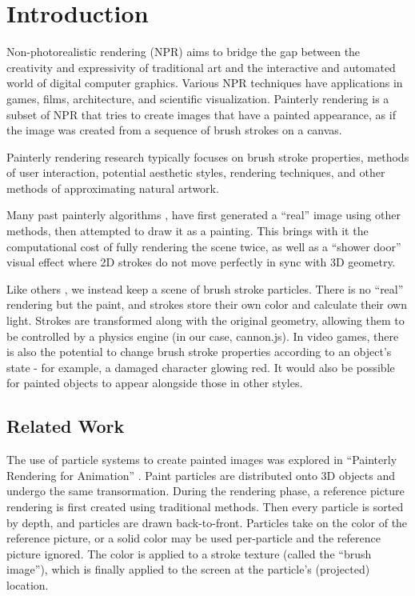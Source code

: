 \documentclass[conference]{acmsiggraph}
\begin{document}
\section{Introduction}

Non-photorealistic rendering (NPR) aims to bridge the gap between the
creativity and expressivity of traditional art and the interactive and
automated world of digital computer graphics. Various NPR techniques have
applications in games, films, architecture, and scientific visualization.
Painterly rendering is a subset of NPR that tries to create images that have a
painted appearance, as if the image was created from a sequence of brush
strokes on a canvas.

Painterly rendering research typically focuses on brush stroke properties,
methods of user interaction, potential aesthetic styles, rendering techniques,
and other methods of approximating natural artwork.

Many past painterly algorithms \cite{Hertzmann:1998:PRC:280814.280951},
\cite{Lu:2010:IPS:1730804.1730825} have first generated a ``real'' image using
other methods, then attempted to draw it as a painting. This brings with it the
computational cost of fully rendering the scene twice, as well as a
``shower door'' visual effect where 2D strokes do not move perfectly in sync
with 3D geometry.

Like others \cite{Meier:1996:PRA:237170.237288}, we instead keep a scene of
brush stroke particles. There is no ``real'' rendering but the paint, and
strokes store their own color and calculate their own light. Strokes are
transformed along with the original geometry, allowing them to be controlled by
a physics engine (in our case, cannon.js). In video games, there is also the
potential to change brush stroke properties according to an object’s state -
for example, a damaged character glowing red. It would also be possible for
painted objects to appear alongside those in other styles.


\subsection{Related Work}

The use of particle systems to create painted images was explored in
``Painterly Rendering for Animation'' \cite{Meier:1996:PRA:237170.237288}.
Paint particles are distributed onto 3D objects and undergo the same
transormation. During the rendering phase, a reference picture rendering is
first created using traditional methods. Then every particle is sorted by
depth, and particles are drawn back-to-front. Particles take on the color of
the reference picture, or a solid color may be used per-particle and the
reference picture ignored. The color is applied to a stroke texture (called
the ``brush image''), which is finally applied to the screen at the particle's
(projected) location.
\end{document}
